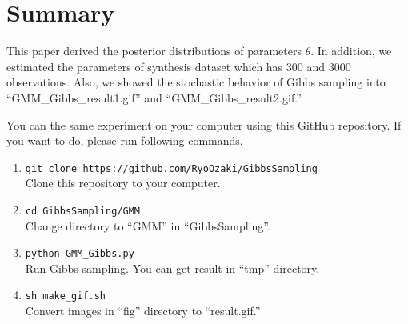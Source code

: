 \documentclass[a4paper]{article}
\begin{document}
\newpage
\section{Summary}
This paper derived the posterior distributions of parameters $\theta$.
In addition, we estimated the parameters of synthesis dataset which has 300 and 3000 observations.
Also, we showed the stochastic behavior of Gibbs sampling into ``GMM\_Gibbs\_result1.gif'' and ``GMM\_Gibbs\_result2.gif.''

You can the same experiment on your computer using this GitHub repository.
If you want to do, please run following commands.
\begin{enumerate}
	\item \verb|git clone https://github.com/RyoOzaki/GibbsSampling|\\
		Clone this repository to your computer.
	\item \verb|cd GibbsSampling/GMM|\\
		Change directory to ``GMM'' in ``GibbsSampling''.
	\item \verb|python GMM_Gibbs.py|\\
		Run Gibbs sampling. You can get result in ``tmp'' directory.
	\item \verb|sh make_gif.sh|\\
		Convert images in ``fig'' directory to ``result.gif.''
\end{enumerate}
\end{document}
